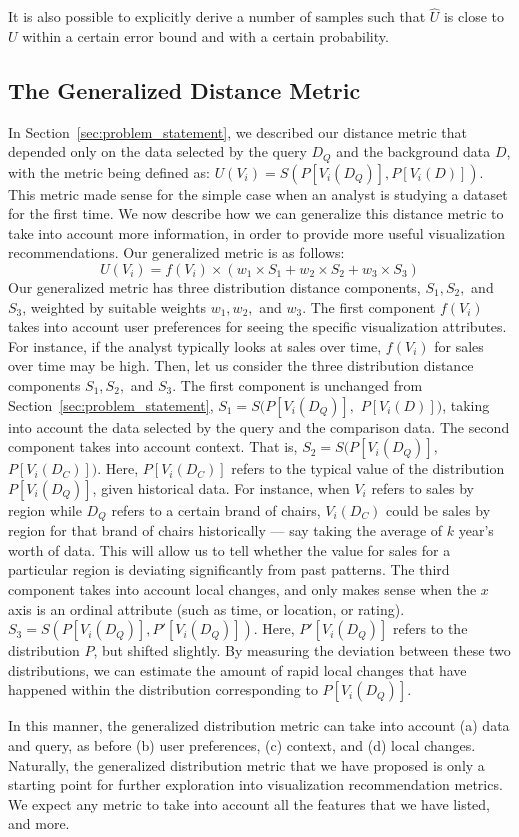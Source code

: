 It is also possible to explicitly derive a number of samples 
such that $\hat{U}$ is close to $U$ within a certain error bound
and with a certain probability. 




\subsection{The Generalized Distance Metric}\label{sec:general-metric}

In Section~\ref{sec:problem_statement}, we described our
distance metric that depended only on the data selected
by the query $D_Q$ and the background data $D$,
with the metric being defined as:
$ U (V_i) = S ( P[V_i (D_Q)], P[V_i (D)] )$.
This metric made sense for the simple case
when an analyst is studying a dataset for the first time.
We now describe how we can generalize this distance
metric to take into account more information,
in order to provide more useful visualization recommendations.
Our generalized metric is as follows:
$$ U (V_i) = f(V_i) \times (w_1\times S_1 + w_2 \times S_2 + w_3 \times S_3)$$
Our generalized metric has three distribution
distance components, $S_1, S_2,$ and $S_3$,
weighted by suitable weights $w_1, w_2,$ and $w_3$.
The first component $f(V_i)$ takes into
account user preferences for seeing the specific 
visualization attributes.
For instance, if the analyst typically looks at
sales over time, $f(V_i)$ for sales over time
may be high.
Then, let us consider the three distribution distance
components $S_1, S_2,$ and $S_3$.
The first component is unchanged from Section~\ref{sec:problem_statement},
$S_1 = S ( P[V_i (D_Q)],$ $P[V_i (D)] )$,
taking into account the data selected by the query and
the comparison data.
The second component takes into account context.
That is, $S_2 = S ( P[V_i (D_Q)], $ $P[V_i (D_C)] )$.
Here, $P[V_i (D_C)]$ refers to the typical value of the distribution 
$P[V_i (D_Q)]$,
given historical data.
For instance, when $V_i$ refers to sales by
region while $D_Q$ refers to a certain brand of chairs,
$V_i(D_C)$ could be sales by region for that brand of chairs
historically --- say taking the average of $k$ year's worth of data.
This will allow us to tell whether the value for sales for a particular
region is deviating significantly from past patterns.
The third component takes into account local changes,
and only makes sense when the $x$ axis is an ordinal attribute
(such as time, or location, or rating).
$S_3 = S ( P[V_i (D_Q)], P'[V_i (D_Q)] )$.
Here, $P'[V_i (D_Q)]$ refers to the distribution $P$, but shifted slightly.
By measuring the deviation between these two distributions,
we can estimate the amount of rapid local changes that have happened
within the distribution corresponding to $P[V_i (D_Q)]$.

In this manner, the generalized distribution metric can take into
account (a) data and query, as before
(b) user preferences, (c) context,
and (d) local changes.
Naturally, the generalized distribution metric that
we have proposed is only a starting point for further exploration
into visualization recommendation metrics.
We expect any metric to take into account all the features
that we have listed, and more.






